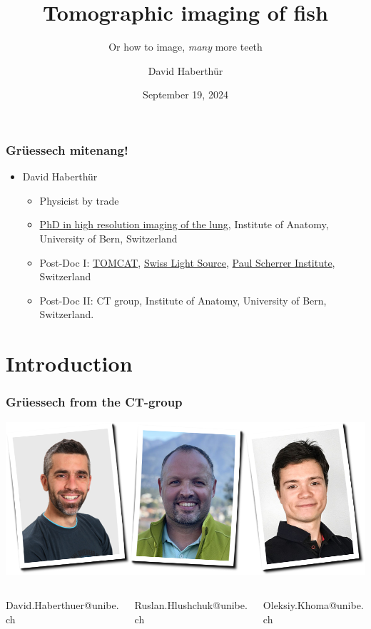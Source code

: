 \documentclass[aspectratio=169,10pt]{beamer}
\title{Tomographic imaging of fish}
\subtitle{Or how to image, \emph{many} more teeth}
\author{David Haberthür}
\institute{Institute of Anatomy}
\date{September 19, 2024}
\newcommand{\imageheight}{0.618\paperheight}%
\newcommand{\uct}{{\textmu}CT\xspace}%
\begin{document}
{%
	\begin{frame}[noframenumbering]
		\maketitle
	\end{frame}%
}

\begin{frame}
	\frametitle{Grüessech mitenang!}
	\begin{itemize}
		\item David Haberthür
		\begin{itemize}
			\item Physicist by trade
			\item \href{https://boris.unibe.ch/2619/}{PhD in high resolution imaging of the lung}, Institute of Anatomy, University of Bern, Switzerland
			\item Post-Doc I: \href{https://www.psi.ch/sls/tomcat/}{TOMCAT}, \href{https://www.psi.ch/sls/}{Swiss Light Source}, \href{https://www.psi.ch/}{Paul Scherrer Institute}, Switzerland
			\item Post-Doc II: \uct{} group, Institute of Anatomy, University of Bern, Switzerland.
		\end{itemize}
	\end{itemize}
\end{frame}

\section{Introduction}
\begin{frame}
	\frametitle{Grüessech from the \uct-group}
	\centering
	\includegraphics[height=\imageheight]{./media/team}
		\begin{columns}
		\hfill\begin{column}{0.33\textwidth}
			\centering%
			David{\color{ubRed!61.8}.}Haberthuer{\color{ubRed!61.8}@unibe.ch}%
		\end{column}
		\begin{column}{0.33\textwidth}
			\centering%
			Ruslan{\color{ubRed!61.8}.}Hlushchuk{\color{ubRed!61.8}@unibe.ch}%
		\end{column}
		\begin{column}{0.33\textwidth}
			\centering%
			Oleksiy{\color{ubRed!61.8}.}Khoma{\color{ubRed!61.8}@unibe.ch}%
		\end{column}\hfill%
	\end{columns}
\end{frame}
\end{document}
